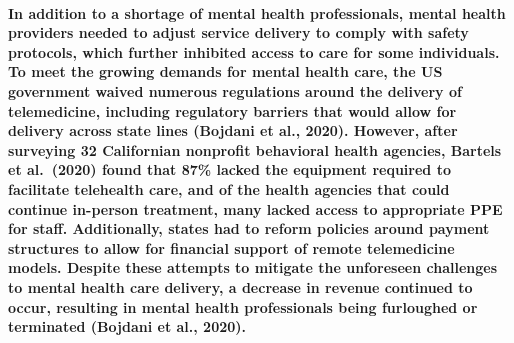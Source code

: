 \documentclass[
  12pt,
]{article}
\begin{document}
{\paragraph{In addition to a shortage of mental health professionals,
mental health providers needed to adjust service delivery to comply with
safety protocols, which further inhibited access to care for some
individuals. To meet the growing demands for mental health care, the US
government waived numerous regulations around the delivery of
telemedicine, including regulatory barriers that would allow for
delivery across state lines (Bojdani et al., 2020). However, after
surveying 32 Californian nonprofit behavioral health agencies, Bartels
et al.~(2020) found that 87\% lacked the equipment required to
facilitate telehealth care, and of the health agencies that could
continue in-person treatment, many lacked access to appropriate PPE for
staff. Additionally, states had to reform policies around payment
structures to allow for financial support of remote telemedicine models.
Despite these attempts to mitigate the unforeseen challenges to mental
health care delivery, a decrease in revenue continued to occur,
resulting in mental health professionals being furloughed or terminated
(Bojdani et al.,
2020).}\label{in-addition-to-a-shortage-of-mental-health-professionals-mental-health-providers-needed-to-adjust-service-delivery-to-comply-with-safety-protocols-which-further-inhibited-access-to-care-for-some-individuals.-to-meet-the-growing-demands-for-mental-health-care-the-us-government-waived-numerous-regulations-around-the-delivery-of-telemedicine-including-regulatory-barriers-that-would-allow-for-delivery-across-state-lines-bojdani-et-al.-2020.-however-after-surveying-32-californian-nonprofit-behavioral-health-agencies-bartels-et-al.-2020-found-that-87-lacked-the-equipment-required-to-facilitate-telehealth-care-and-of-the-health-agencies-that-could-continue-in-person-treatment-many-lacked-access-to-appropriate-ppe-for-staff.-additionally-states-had-to-reform-policies-around-payment-structures-to-allow-for-financial-support-of-remote-telemedicine-models.-despite-these-attempts-to-mitigate-the-unforeseen-challenges-to-mental-health-care-delivery-a-decrease-in-revenue-continued-to-occur-resulting-in-mental-health-professionals-being-furloughed-or-terminated-bojdani-et-al.-2020.}}
\end{document}
